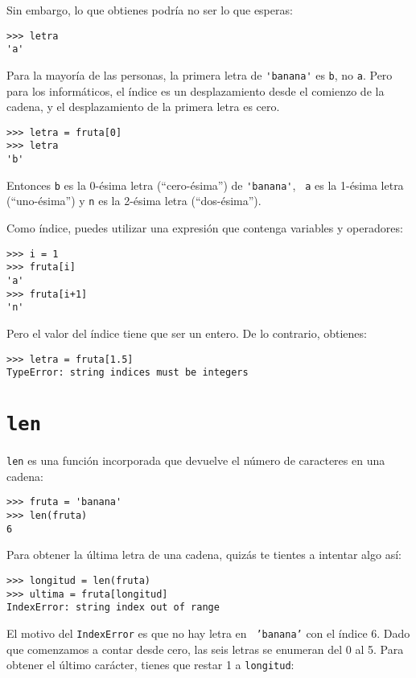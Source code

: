 \documentclass[10pt]{book}
\begin{document}
Sin embargo, lo que obtienes podría no ser lo que esperas:

\begin{verbatim}
>>> letra
'a'
\end{verbatim}
%
Para la mayoría de las personas, la primera letra de \verb"'banana'" es {\tt b}, no
{\tt a}.  Pero para los informáticos, el índice es un desplazamiento desde el
comienzo de la cadena, y el desplazamiento de la primera letra es cero.

\begin{verbatim}
>>> letra = fruta[0]
>>> letra
'b'
\end{verbatim}
%
Entonces {\tt b} es la 0-ésima letra  (``cero-ésima'') de \verb"'banana'", {\tt
  a} es la 1-ésima letra (``uno-ésima'') y {\tt n} es la 2-ésima letra
(``dos-ésima'').   

Como índice, puedes utilizar una expresión que contenga variables y
operadores:

\begin{verbatim}
>>> i = 1
>>> fruta[i]
'a'
>>> fruta[i+1]
'n'
\end{verbatim}
%

Pero el valor del índice tiene que ser un entero.  De lo contrario,
obtienes:

\begin{verbatim}
>>> letra = fruta[1.5]
TypeError: string indices must be integers
\end{verbatim}
%

\section{{\tt len}}

{\tt len} es una función incorporada que devuelve el número de caracteres
en una cadena:

\begin{verbatim}
>>> fruta = 'banana'
>>> len(fruta)
6
\end{verbatim}
%
Para obtener la última letra de una cadena, quizás te tientes a intentar algo
así:

\begin{verbatim}
>>> longitud = len(fruta)
>>> ultima = fruta[longitud]
IndexError: string index out of range
\end{verbatim}
%
El motivo del {\tt IndexError} es que no hay letra en {\tt
'banana'} con el índice 6.  Dado que comenzamos a contar desde cero, las
seis letras se enumeran del 0 al 5.  Para obtener el último carácter, tienes
que restar 1 a {\tt longitud}:
\end{document}
